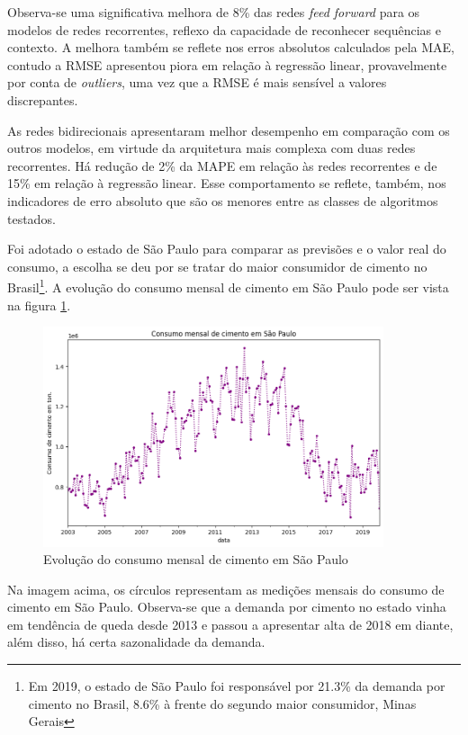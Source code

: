 Observa-se uma significativa melhora de 8\% das redes \textit{feed forward} para os modelos
de redes recorrentes, reflexo da capacidade de reconhecer sequências e contexto.
A melhora também se reflete nos erros absolutos calculados pela MAE, contudo a 
RMSE apresentou piora em relação à regressão linear, provavelmente por conta 
de \textit{outliers}, uma vez que a RMSE é mais sensível a valores discrepantes.

As redes bidirecionais apresentaram melhor desempenho em comparação com os outros 
modelos, em virtude da arquitetura mais complexa com duas redes recorrentes. Há 
redução de 2\% da MAPE em relação às redes recorrentes e de 15\% em relação à 
regressão linear. Esse comportamento se reflete, também, nos indicadores de 
erro absoluto que são os menores entre as classes de algoritmos testados.

Foi adotado o estado de São Paulo para comparar as previsões  e o valor real 
do consumo, a escolha se deu por 
se tratar do maior consumidor de cimento no Brasil\footnote{Em 2019, o estado 
de São Paulo foi 
responsável por 21.3\% da demanda por cimento no Brasil, 8.6\% à frente do 
segundo maior consumidor, Minas Gerais}. A evolução do consumo 
mensal de cimento em São Paulo pode ser vista na figura \ref{consumo-sp}.

\begin{figure}[H]
    \centering
    \includegraphics[width=10cm]{../figuras/graficos/evolucao-consumo-sp.png}
    \caption{Evolução do consumo mensal de cimento em São Paulo}
    \label{consumo-sp}
\end{figure}

Na imagem acima, os círculos representam as medições mensais do consumo de 
cimento em São Paulo. Observa-se que a demanda por cimento no estado vinha em tendência
de queda desde 2013 e passou a apresentar alta de 2018 em diante, além disso, há certa
sazonalidade da demanda.

